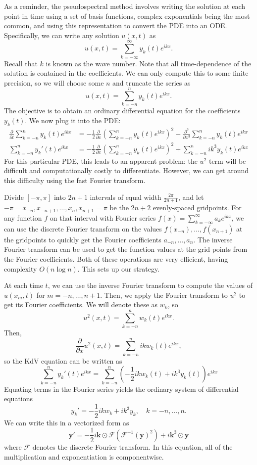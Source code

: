 As a reminder, the pseudospectral method involves writing the solution at each point in time using a set of basis functions, complex exponentials being the most common, and using this representation to convert the PDE into an ODE.
Specifically, we can write any solution \(u(x,t)\) as
\[
u(x,t) = \sum_{k=-\infty}^\infty y_k(t)e^{ikx}.
\]
Recall that \(k\) is known as the wave number.
Note that all time-dependence of the solution is contained in the coefficients.
We can only compute this to some finite precision, so we will choose some \(n\) and truncate the series as
\[
u(x,t) = \sum_{k=-n}^n y_k(t)e^{ikx}.
\]
The objective is to obtain an ordinary differential equation for the coefficients \(y_k(t)\).
We now plug it into the PDE:
\begin{align*}
\frac{\partial}{\partial t}\sum_{k=-n}^n y_k(t)e^{ikx}
&=
-\frac{1}{2} \frac{\partial}{\partial x}\left(
\sum_{k=-n}^n y_k(t)e^{ikx}
\right)^2
-
\frac{\partial^3}{\partial x^3}\sum_{k=-n}^n y_k(t)e^{ikx}
\\
\sum_{k=-n}^n y_k'(t)e^{ikx}
&=
-\frac{1}{2} \frac{\partial}{\partial x}\left(
\sum_{k=-n}^n y_k(t)e^{ikx}
\right)^2
+
\sum_{k=-n}^n ik^3 y_k(t)e^{ikx}
\end{align*}
For this particular PDE, this leads to an apparent problem: the \(u^2\) term will be difficult and computationally costly to differentiate.
However, we can get around this difficulty using the fast Fourier transform.

Divide \([-\pi, \pi]\) into \(2n+1\) intervals of equal width \(\frac{2\pi}{2n+1}\), and let \(-\pi=x_{-n},x_{-n+1},\ldots,x_n,x_{n+1}=\pi\) be the \(2n+2\) evenly-spaced gridpoints.
For any function \(f\) on that interval with Fourier series \(f(x)=\sum_{k=-\infty}^\infty a_k e^{ikx}\), we can use the discrete Fourier transform on the values \(f(x_{-n}),\ldots,f(x_{n+1})\) at the gridpoints to quickly get the Fourier coefficients \(a_{-n},\ldots, a_n\).
The inverse Fourier transform can be used to get the function values at the grid points from the Fourier coefficients.
Both of these operations are very efficient, having complexity \(O(n\log n)\).
This sets up our strategy.

At each time \(t\), we can use the inverse Fourier transform to compute the values of \(u(x_m,t)\) for \(m=-n,\ldots,n+1\).
Then, we apply the Fourier transform to \(u^2\) to get its Fourier coefficients.
We will denote these as \(w_k\), so
\[
u^2(x,t)=\sum_{k=-n}^n w_k(t) e^{ikx}.
\]
Then, 
\[
\frac{\partial}{\partial x}
u^2(x,t)=\sum_{k=-n}^n ik w_k(t) e^{ikx},
\]
so the KdV equation can be written as
\[
\sum_{k=-n}^n y_k'(t)e^{ikx}
=
\sum_{k=-n}^n \left(
-\frac{1}{2}ikw_k(t)
+
ik^3 y_k(t)
\right)e^{ikx}
\]
Equating terms in the Fourier series yields the ordinary system of differential equations
\[
y_k' = -\frac{1}{2}ikw_k + ik^3 y_k, \quad k=-n,\ldots, n.
\]
We can write this in a vectorized form as
\begin{equation}
\mathbf{y}' = -\frac{1}{2}i\mathbf{k}\odot\mathcal{F}(\mathcal{F}^{-1}(\mathbf{y})^2) + i\mathbf{k}^3 \odot\mathbf{y}
\label{lab:solitons:pseudospectral}
\end{equation}
where \(\mathcal{F}\) denotes the discrete Fourier transform.
In this equation, all of the multiplication and exponentiation is componentwise.

